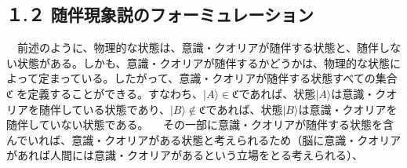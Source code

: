 \subsection{１.２ 随伴現象説のフォーミュレーション}
　前述のように、物理的な状態は、意識・クオリアが随伴する状態と、随伴しない状態がある。しかも、意識・クオリアが随伴するかどうかは、物理的な状態によって定まっている。したがって、意識・クオリアが随伴する状態すべての集合 $\mathfrak{C}$ を定義することができる。すなわち、$|A\rangle\in\mathfrak{C}$であれば、状態$|A\rangle$は意識・クオリアを随伴している状態であり、$|B\rangle\notin\mathfrak{C}$であれば、状態$|B\rangle$は意識・クオリアを随伴していない状態である。
　その一部に意識・クオリアが随伴する状態を含んでいれば、意識・クオリアがある状態と考えられるため（脳に意識・クオリアがあれば人間には意識・クオリアがあるという立場をとる考えられる）、